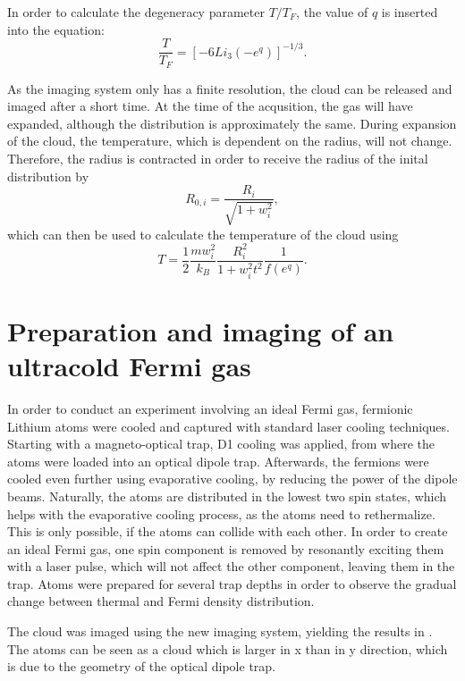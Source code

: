 In order to calculate the degeneracy parameter $T/T_F$, the value of $q$ is inserted into the equation:
\begin{equation}
\label{eq:tovertf}
\frac{T}{T_F} = \left[ -6 Li_3(-e^q) \right]^{-1/3}.
\end{equation}

As the imaging system only has a finite resolution, the cloud can be released and imaged after a short time. At the time of the acqusition, the gas will have expanded, although the distribution is approximately the same. During expansion of the cloud, the temperature, which is dependent on the radius, will not change. Therefore, the radius is contracted in order to receive the radius of the inital distribution by
\begin{equation}
R_{0,i} = \frac{R_{i}}{\sqrt{1+ w_i^2}},
\end{equation}
which can then be used to calculate the temperature of the cloud using
\begin{equation}
\label{eq:temp}
T = \frac{1}{2} \frac{mw_i^2}{k_B} \frac{R_i^2}{1+w_i^2t^2}\frac{1}{f(e^q)}.
\end{equation}


	
\section{Preparation and imaging of an ultracold Fermi gas}
\label{sec:fermiexperiment}

In order to conduct an experiment involving an ideal Fermi gas, fermionic Lithium atoms were cooled and captured with standard laser cooling techniques\cite{Repp2013, Pires2014}. Starting with a magneto-optical trap, D1 cooling was applied, from where the atoms were loaded into an optical dipole trap. Afterwards, the fermions were cooled even further using evaporative cooling, by reducing the power of the dipole beams. Naturally, the atoms are distributed in the lowest two spin states, which helps with the evaporative cooling process, as the atoms need to rethermalize. This is only possible, if the atoms can collide with each other. In order to create an ideal Fermi gas, one spin component is removed by resonantly exciting them with a laser pulse, which will not affect the other component, leaving them in the trap. Atoms were prepared for several trap depths in order to observe the gradual change between thermal and Fermi density distribution.

The cloud was imaged using the new imaging system, yielding the results in . The atoms can be seen as a cloud which is larger in x than in y direction, which is due to the geometry of the optical dipole trap.

